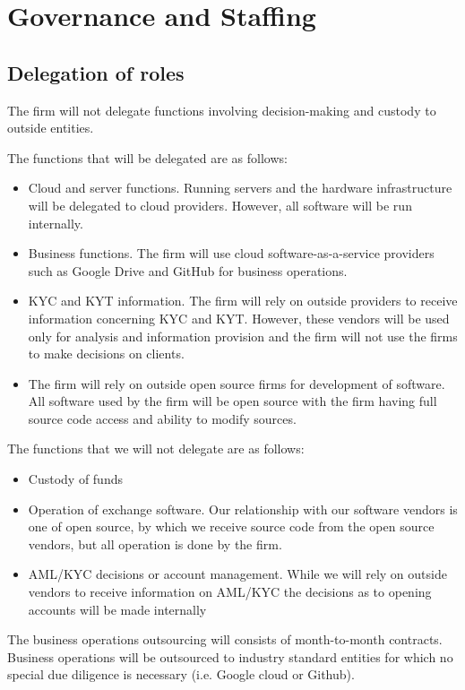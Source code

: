 \chapter{Governance and Staffing}

\section{Delegation of roles}

The firm will not delegate functions involving decision-making and
custody to outside entities.

The functions that will be delegated are as follows:
\begin{itemize}
  \item Cloud and server functions.  Running servers and the hardware
    infrastructure will be delegated to cloud providers.  However, all
    software will be run internally.
 \item Business functions.  The firm will use cloud software-as-a-service providers such
   as Google Drive and GitHub for business operations.
 \item KYC and KYT information.  The firm will rely on outside
   providers to receive information concerning KYC and KYT.  However,
   these vendors will be used only for analysis and information
   provision and the firm will not use the firms to make decisions on
   clients.
\item The firm will rely on outside open source firms for development
  of software.  All software used by the firm will be open source with
  the firm having full source code access and ability to modify sources.
\end{itemize}

The functions that we will not delegate are as follows:
\begin{itemize}
\item Custody of funds
  \item Operation of exchange software.  Our relationship with our
    software vendors is one of open source, by which we receive source
    code from the open source vendors, but all operation is done by
    the firm.
 \item AML/KYC decisions or account management.  While we will rely on
   outside vendors to receive information on AML/KYC the decisions as
   to opening accounts will be made internally
\end{itemize}

The business operations outsourcing will consists of month-to-month
contracts.  Business operations will be outsourced to industry
standard entities for which no special due diligence is necessary
(i.e. Google cloud or Github).

